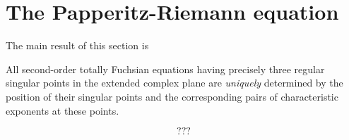\section{The Papperitz-Riemann equation}

The main result of this section is
\begin{approfondimento}
   All second-order totally Fuchsian equations having precisely
   three regular singular points in the extended complex plane
   are \emph{uniquely} determined by the position of their
   singular points and the corresponding pairs of characteristic exponents at
   these points.
\end{approfondimento}

\begin{dmath*}
   ??? %
\end{dmath*}
